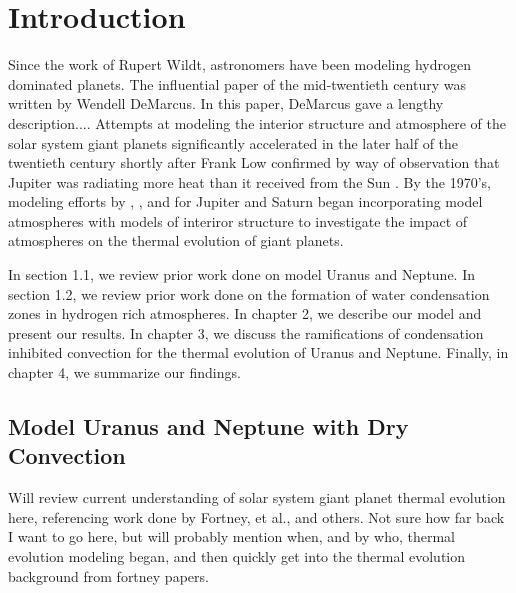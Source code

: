 \documentclass[11pt]{ucscthesisbs}
\begin{document}
\chapter{Introduction}
Since the work of Rupert Wildt\citep{wildt_1947}, astronomers have been modeling hydrogen dominated planets. The influential paper of the mid-twentieth century was written by Wendell DeMarcus\citep{demarcus_1958}. In this paper, DeMarcus gave a lengthy description.... Attempts at modeling the interior structure and atmosphere of the solar system giant planets significantly accelerated in the later half of the twentieth century shortly after Frank Low confirmed by way of observation that Jupiter was radiating more heat than it received from the Sun \citep{low_1966}. By the 1970's, modeling efforts by \citep{graboske_1975}, \citep{hubbard_1977}, and \citep{pollack_1977} for Jupiter and Saturn began incorporating model atmospheres with models of interiror structure to investigate the impact of atmospheres on the thermal evolution of giant planets. 

In section 1.1, we review prior work done on model Uranus and Neptune. In section 1.2, we review prior work done on the formation of water condensation zones in hydrogen rich atmospheres. In chapter 2, we describe our model and present our results. In chapter 3, we discuss the ramifications of condensation inhibited convection for the thermal evolution of Uranus and Neptune. Finally, in chapter 4, we summarize our findings.\citep{friedson_2017} \citep{leconte_2017} \citep{pollack_1977}\citep{fortney_2011} \citep{graboske_1975} \citep{guillot_2019} \citep{guillot_1995}

\section{Model Uranus and Neptune with Dry Convection}\label{model_atmosphere_background}

Will review current understanding of solar system giant planet thermal evolution here, referencing work done by Fortney, et al., and others. Not sure how far back I want to go here, but will probably mention when, and by who, thermal evolution modeling began, and then quickly get into the thermal evolution background from fortney papers.
\end{document}
